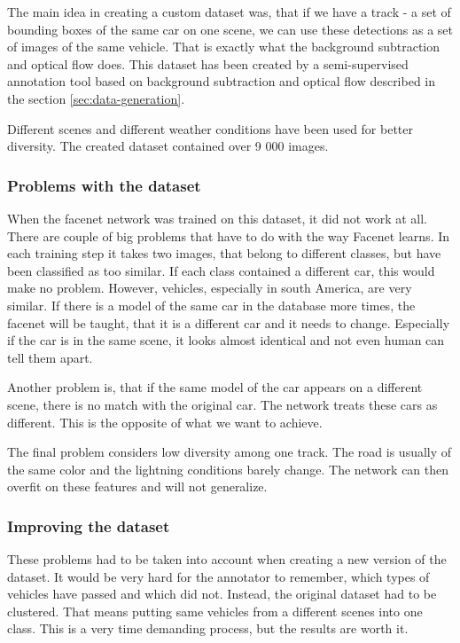 \documentclass[a4paper,12pt,titlepage]{article}
\numberwithin{figure}{section}
\begin{document}
The main idea in creating a custom dataset was, that if we have a track - a set of bounding boxes of the same car on one scene, we can use these detections as a set of images of the same vehicle. That is exactly what the background subtraction and optical flow does. This dataset has been created by a semi-supervised annotation tool based on background subtraction and optical flow described in the section \ref{sec:data-generation}.

Different scenes and different weather conditions have been used for better diversity. The created dataset contained over 9 000 images.

\subsubsection{Problems with the dataset}
When the facenet network was trained on this dataset, it did not work at all. There are couple of big problems that have to do with the way Facenet learns. In each training step it takes two images, that belong to different classes, but have been classified as too similar. If each class contained a different car, this would make no problem. However, vehicles, especially in south America, are very similar. If there is a model of the same car in the database more times, the facenet will be taught, that it is a different car and it needs to change. Especially if the car is in the same scene, it looks almost identical and not even human can tell them apart. 

Another problem is, that if the same model of the car appears on a different scene, there is no match with the original car. The network treats these cars as different. This is the opposite of what we want to achieve.

The final problem considers low diversity among one track. The road is usually of the same color and the lightning conditions barely change. The network can then overfit on these features and will not generalize.

\subsubsection{Improving the dataset}
These problems had to be taken into account when creating a new version of the dataset. It would be very hard for the annotator to remember, which types of vehicles have passed and which did not. Instead, the original dataset had to be clustered. That means putting same vehicles from a different scenes into one class. This is a very time demanding process, but the results are worth it.
\end{document}
